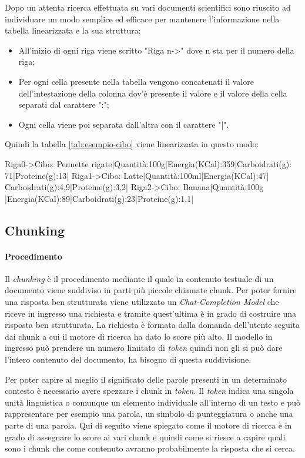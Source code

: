 \noindent Dopo un attenta ricerca effettuata su vari documenti scientifici sono riuscito ad individuare un modo semplice ed efficace per mantenere 
l'informazione nella tabella linearizzata e la sua struttura:
\begin{itemize}
    \item All'inizio di ogni riga viene scritto "Riga n->" dove n sta per il numero della riga;
    \item Per ogni cella presente nella tabella vengono concatenati il valore dell'intestazione della colonna dov'è presente il valore e il valore della cella separati dal carattere ":";
    \item Ogni cella viene poi separata dall'altra con il carattere "|".
\end{itemize} 

Quindi la tabella \ref{tab:esempio-cibo} viene linearizzata in questo modo:
\begin{tcolorbox}[colback=white, colframe=black]
    Riga0->Cibo: Pennette rigate|Quantità:100g|Energia(KCal):359|Carboidrati(g): \\
    71|Proteine(g):13| Riga1->Cibo: Latte|Quantità:100ml|Energia(KCal):47| \\
    Carboidrati(g):4,9|Proteine(g):3,2| Riga2->Cibo: Banana|Quantità:100g \\
    |Energia(KCal):89|Carboidrati(g):23|Proteine(g):1,1|
\end{tcolorbox}

\subsection{Chunking}
\paragraph{Procedimento}
Il \emph{chunking} è il procedimento mediante il quale in contenuto testuale di un documento viene suddiviso in parti più piccole chiamate chunk.
\noindent Per poter fornire una risposta ben strutturata viene utilizzato un \emph{Chat-Completion Model} che riceve in ingresso una richiesta e tramite quest'ultima è in grado di costruire una risposta ben strutturata.
La richiesta è formata dalla domanda dell'utente seguita dai chunk a cui il motore di ricerca ha dato lo score più alto.
Il modello in ingresso può prendere un numero limitato di \emph{token} quindi non gli si può dare l'intero contenuto del documento, ha bisogno di questa suddivisione.

\noindent Per poter capire al meglio il significato delle parole presenti in un determinato contesto è necessario avere spezzare i chunk in \emph{token}.
Il \emph{token} indica una singola unità linguistica o comunque un elemento individuale all'interno di un testo e può rappresentare per esempio una parola, un simbolo di punteggiatura o anche una parte di una parola.
Qui di seguito viene spiegato come il motore di ricerca è in grado di assegnare lo score ai vari chunk e quindi come si riesce a capire quali sono i chunk che come contenuto avranno probabilmente la risposta che si cerca.

